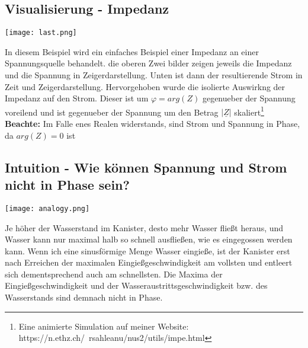 \documentclass[11pt,a4paper]{article}
\begin{document}
\subsection{Visualisierung - Impedanz}
\begin{center}
    \texttt{[image: last.png]}

\end{center}
In diesem Beispiel wird ein einfaches Beispiel einer Impedanz an einer Spannungsquelle behandelt. die oberen Zwei bilder zeigen jeweils die Impedanz und die Spannung in Zeigerdarstellung. Unten ist dann der resultierende Strom in Zeit und Zeigerdarstellung. Hervorgehoben wurde die isolierte Auswirkng der Impedanz auf den Strom. Dieser ist um $\varphi = arg(Z)$ gegenueber der Spannung voreilend und ist gegenueber der Spannung um den Betrag $|\underline{Z}|$ skaliert\footnote{Eine animierte Simulation auf meiner Website: https://n.ethz.ch/~rsahleanu/nus2/utils/impe.html}\\
\textbf{Beachte:} Im Falle enes Realen widerstands, sind Strom und Spannung in Phase, da $arg(Z) = 0$ ist
\subsection{Intuition - Wie können Spannung und Strom nicht in Phase sein? }



\noindent%
{
  \begin{minipage}[t]{0.4\textwidth}
    \vspace{0pt} %
    \centering
    \texttt{[image: analogy.png]}

  \end{minipage}%
}
\hfill%
{
  \begin{minipage}[t]{0.55\textwidth}
    \vspace{0pt} %
    
Je höher der Wasserstand im Kanister, desto mehr Wasser fließt heraus, und Wasser kann nur maximal halb so schnell ausfließen, wie es eingegossen werden kann. Wenn ich eine sinusförmige Menge Wasser eingieße, ist der Kanister erst nach Erreichen der maximalen Eingießgeschwindigkeit am vollsten und entleert sich dementsprechend auch am schnellsten. Die Maxima der Eingießgeschwindigkeit und der Wasseraustrittsgeschwindigkeit bzw. des Wasserstands sind demnach nicht in Phase.
  \end{minipage}%
}

\newpage
\end{document}
